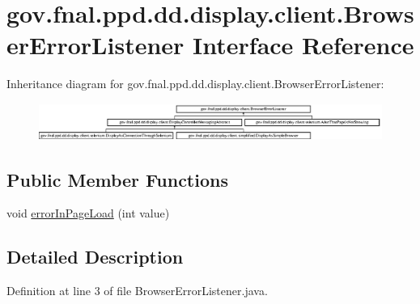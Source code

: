 \hypertarget{interfacegov_1_1fnal_1_1ppd_1_1dd_1_1display_1_1client_1_1BrowserErrorListener}{\section{gov.\-fnal.\-ppd.\-dd.\-display.\-client.\-Browser\-Error\-Listener Interface Reference}
\label{interfacegov_1_1fnal_1_1ppd_1_1dd_1_1display_1_1client_1_1BrowserErrorListener}
}
Inheritance diagram for gov.\-fnal.\-ppd.\-dd.\-display.\-client.\-Browser\-Error\-Listener\-:\begin{figure}[H]
\begin{center}
\leavevmode
\includegraphics[height=1.209503cm]{interfacegov_1_1fnal_1_1ppd_1_1dd_1_1display_1_1client_1_1BrowserErrorListener}
\end{center}
\end{figure}
\subsection*{Public Member Functions}
\begin{DoxyCompactItemize}
\item 
void \hyperlink{interfacegov_1_1fnal_1_1ppd_1_1dd_1_1display_1_1client_1_1BrowserErrorListener_a3e9b377582160013a1ff99cfe29765f3}{error\-In\-Page\-Load} (int value)
\end{DoxyCompactItemize}


\subsection{Detailed Description}


Definition at line 3 of file Browser\-Error\-Listener.\-java.



